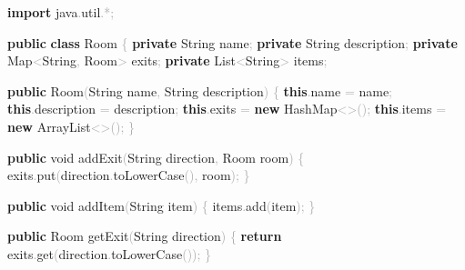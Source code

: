 \documentclass[
  justified,
  openright,
]{tufte-book}
\newcommand{\KeywordTok}[1]{\textcolor{CodeKeyword}{\textbf{#1}}}  %
\newcommand{\CodeFuncTok}[1]{\textcolor{CodeKeyword}{#1}}           %
\newcommand{\CodeTypeTok}[1]{\textcolor{CodeType}{#1}}              %
\newcommand{\CodeAccentTok}[1]{\textcolor{CodeAccent}{#1}}          %
\newcommand{\OperatorTok}[1]{\textcolor{DarkGray}{#1}}              %
\newenvironment{Shaded}{%
  \begin{mdframed}[style=TufteCode]%
}{%
  \end{mdframed}%
}
\begin{document}
\begin{Shaded}
\begin{Highlighting}[]
\KeywordTok{import} \CodeAccentTok{java}\OperatorTok{.}\CodeAccentTok{util}\OperatorTok{.*;}
 
\KeywordTok{public} \KeywordTok{class} Room \OperatorTok{\{}
    \KeywordTok{private} String name\OperatorTok{;}
    \KeywordTok{private} String description\OperatorTok{;}
    \KeywordTok{private} Map\OperatorTok{\textless{}}String\OperatorTok{,} Room\OperatorTok{\textgreater{}} exits\OperatorTok{;}
    \KeywordTok{private} List\OperatorTok{\textless{}}String\OperatorTok{\textgreater{}} items\OperatorTok{;}
 
    \KeywordTok{public} \CodeFuncTok{Room}\OperatorTok{(}String name\OperatorTok{,} String description\OperatorTok{)} \OperatorTok{\{}
        \KeywordTok{this}\OperatorTok{.}\CodeFuncTok{name} \OperatorTok{=} name\OperatorTok{;}
        \KeywordTok{this}\OperatorTok{.}\CodeFuncTok{description} \OperatorTok{=} description\OperatorTok{;}
        \KeywordTok{this}\OperatorTok{.}\CodeFuncTok{exits} \OperatorTok{=} \KeywordTok{new} HashMap\OperatorTok{\textless{}\textgreater{}();}
        \KeywordTok{this}\OperatorTok{.}\CodeFuncTok{items} \OperatorTok{=} \KeywordTok{new} ArrayList\OperatorTok{\textless{}\textgreater{}();}
    \OperatorTok{\}}
 
    \KeywordTok{public} \CodeTypeTok{void} \CodeFuncTok{addExit}\OperatorTok{(}String direction\OperatorTok{,} Room room\OperatorTok{)} \OperatorTok{\{}
        exits\OperatorTok{.}\CodeFuncTok{put}\OperatorTok{(}direction\OperatorTok{.}\CodeFuncTok{toLowerCase}\OperatorTok{(),} room\OperatorTok{);}
    \OperatorTok{\}}
 
    \KeywordTok{public} \CodeTypeTok{void} \CodeFuncTok{addItem}\OperatorTok{(}String item\OperatorTok{)} \OperatorTok{\{}
        items\OperatorTok{.}\CodeFuncTok{add}\OperatorTok{(}item\OperatorTok{);}
    \OperatorTok{\}}
 
    \KeywordTok{public} Room \CodeFuncTok{getExit}\OperatorTok{(}String direction\OperatorTok{)} \OperatorTok{\{}
        \KeywordTok{return} exits\OperatorTok{.}\CodeFuncTok{get}\OperatorTok{(}direction\OperatorTok{.}\CodeFuncTok{toLowerCase}\OperatorTok{());}
    \OperatorTok{\}}
 

\end{Highlighting}
\end{Shaded}
\end{document}
